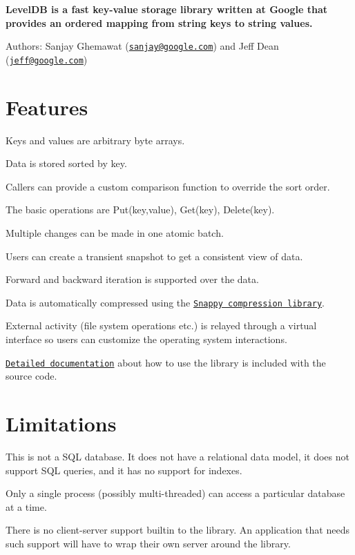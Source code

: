{\bfseries Level\+DB is a fast key-\/value storage library written at Google that provides an ordered mapping from string keys to string values.}

Authors\+: Sanjay Ghemawat (\href{mailto:sanjay@google.com}{\tt sanjay@google.\+com}) and Jeff Dean (\href{mailto:jeff@google.com}{\tt jeff@google.\+com})

\section*{Features}


\begin{DoxyItemize}
\item Keys and values are arbitrary byte arrays.
\item Data is stored sorted by key.
\item Callers can provide a custom comparison function to override the sort order.
\item The basic operations are {\ttfamily Put(key,value)}, {\ttfamily Get(key)}, {\ttfamily Delete(key)}.
\item Multiple changes can be made in one atomic batch.
\item Users can create a transient snapshot to get a consistent view of data.
\item Forward and backward iteration is supported over the data.
\item Data is automatically compressed using the \href{http://code.google.com/p/snappy}{\tt Snappy compression library}.
\item External activity (file system operations etc.) is relayed through a virtual interface so users can customize the operating system interactions.
\item \href{http://htmlpreview.github.io/?https://github.com/google/leveldb/blob/master/doc/index.html}{\tt Detailed documentation} about how to use the library is included with the source code.
\end{DoxyItemize}

\section*{Limitations}


\begin{DoxyItemize}
\item This is not a S\+QL database. It does not have a relational data model, it does not support S\+QL queries, and it has no support for indexes.
\item Only a single process (possibly multi-\/threaded) can access a particular database at a time.
\item There is no client-\/server support builtin to the library. An application that needs such support will have to wrap their own server around the library.
\end{DoxyItemize}

